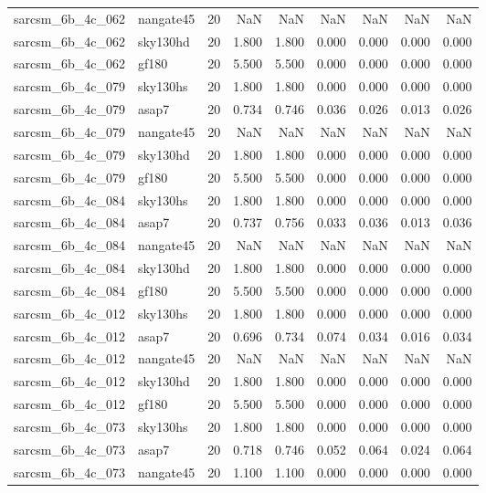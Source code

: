 \begin{tabular}{llrrrrrrr}
sarcsm\_6b\_4c\_062 & nangate45 & 20 & NaN & NaN & NaN & NaN & NaN & NaN \\
sarcsm\_6b\_4c\_062 & sky130hd & 20 & 1.800 & 1.800 & 0.000 & 0.000 & 0.000 & 0.000 \\
sarcsm\_6b\_4c\_062 & gf180 & 20 & 5.500 & 5.500 & 0.000 & 0.000 & 0.000 & 0.000 \\
sarcsm\_6b\_4c\_079 & sky130hs & 20 & 1.800 & 1.800 & 0.000 & 0.000 & 0.000 & 0.000 \\
sarcsm\_6b\_4c\_079 & asap7 & 20 & 0.734 & 0.746 & 0.036 & 0.026 & 0.013 & 0.026 \\
sarcsm\_6b\_4c\_079 & nangate45 & 20 & NaN & NaN & NaN & NaN & NaN & NaN \\
sarcsm\_6b\_4c\_079 & sky130hd & 20 & 1.800 & 1.800 & 0.000 & 0.000 & 0.000 & 0.000 \\
sarcsm\_6b\_4c\_079 & gf180 & 20 & 5.500 & 5.500 & 0.000 & 0.000 & 0.000 & 0.000 \\
sarcsm\_6b\_4c\_084 & sky130hs & 20 & 1.800 & 1.800 & 0.000 & 0.000 & 0.000 & 0.000 \\
sarcsm\_6b\_4c\_084 & asap7 & 20 & 0.737 & 0.756 & 0.033 & 0.036 & 0.013 & 0.036 \\
sarcsm\_6b\_4c\_084 & nangate45 & 20 & NaN & NaN & NaN & NaN & NaN & NaN \\
sarcsm\_6b\_4c\_084 & sky130hd & 20 & 1.800 & 1.800 & 0.000 & 0.000 & 0.000 & 0.000 \\
sarcsm\_6b\_4c\_084 & gf180 & 20 & 5.500 & 5.500 & 0.000 & 0.000 & 0.000 & 0.000 \\
sarcsm\_6b\_4c\_012 & sky130hs & 20 & 1.800 & 1.800 & 0.000 & 0.000 & 0.000 & 0.000 \\
sarcsm\_6b\_4c\_012 & asap7 & 20 & 0.696 & 0.734 & 0.074 & 0.034 & 0.016 & 0.034 \\
sarcsm\_6b\_4c\_012 & nangate45 & 20 & NaN & NaN & NaN & NaN & NaN & NaN \\
sarcsm\_6b\_4c\_012 & sky130hd & 20 & 1.800 & 1.800 & 0.000 & 0.000 & 0.000 & 0.000 \\
sarcsm\_6b\_4c\_012 & gf180 & 20 & 5.500 & 5.500 & 0.000 & 0.000 & 0.000 & 0.000 \\
sarcsm\_6b\_4c\_073 & sky130hs & 20 & 1.800 & 1.800 & 0.000 & 0.000 & 0.000 & 0.000 \\
sarcsm\_6b\_4c\_073 & asap7 & 20 & 0.718 & 0.746 & 0.052 & 0.064 & 0.024 & 0.064 \\
sarcsm\_6b\_4c\_073 & nangate45 & 20 & 1.100 & 1.100 & 0.000 & 0.000 & 0.000 & 0.000 \\

\end{tabular}
